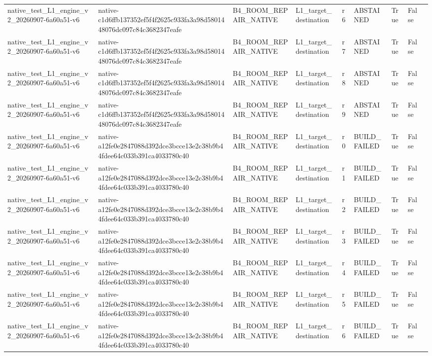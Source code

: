 \begin{tabular}{lllllllll}
native\_test\_L1\_engine\_v2\_20260907-6a60a51-v6 & native-c1d6ffb137352ef5f4f2625c933fa3a98d5801448076dc097c84c3682347eafe & B4\_ROOM\_REPAIR\_NATIVE & L1\_target\_destination & r6 & ABSTAINED & True & False &  \\
native\_test\_L1\_engine\_v2\_20260907-6a60a51-v6 & native-c1d6ffb137352ef5f4f2625c933fa3a98d5801448076dc097c84c3682347eafe & B4\_ROOM\_REPAIR\_NATIVE & L1\_target\_destination & r7 & ABSTAINED & True & False &  \\
native\_test\_L1\_engine\_v2\_20260907-6a60a51-v6 & native-c1d6ffb137352ef5f4f2625c933fa3a98d5801448076dc097c84c3682347eafe & B4\_ROOM\_REPAIR\_NATIVE & L1\_target\_destination & r8 & ABSTAINED & True & False &  \\
native\_test\_L1\_engine\_v2\_20260907-6a60a51-v6 & native-c1d6ffb137352ef5f4f2625c933fa3a98d5801448076dc097c84c3682347eafe & B4\_ROOM\_REPAIR\_NATIVE & L1\_target\_destination & r9 & ABSTAINED & True & False &  \\
native\_test\_L1\_engine\_v2\_20260907-6a60a51-v6 & native-a12fe0e2847088d392dce3bcce13e2c38b9b44fdee64c033b391ca4033780c40 & B4\_ROOM\_REPAIR\_NATIVE & L1\_target\_destination & r0 & BUILD\_FAILED & True & False &  \\
native\_test\_L1\_engine\_v2\_20260907-6a60a51-v6 & native-a12fe0e2847088d392dce3bcce13e2c38b9b44fdee64c033b391ca4033780c40 & B4\_ROOM\_REPAIR\_NATIVE & L1\_target\_destination & r1 & BUILD\_FAILED & True & False &  \\
native\_test\_L1\_engine\_v2\_20260907-6a60a51-v6 & native-a12fe0e2847088d392dce3bcce13e2c38b9b44fdee64c033b391ca4033780c40 & B4\_ROOM\_REPAIR\_NATIVE & L1\_target\_destination & r2 & BUILD\_FAILED & True & False &  \\
native\_test\_L1\_engine\_v2\_20260907-6a60a51-v6 & native-a12fe0e2847088d392dce3bcce13e2c38b9b44fdee64c033b391ca4033780c40 & B4\_ROOM\_REPAIR\_NATIVE & L1\_target\_destination & r3 & BUILD\_FAILED & True & False &  \\
native\_test\_L1\_engine\_v2\_20260907-6a60a51-v6 & native-a12fe0e2847088d392dce3bcce13e2c38b9b44fdee64c033b391ca4033780c40 & B4\_ROOM\_REPAIR\_NATIVE & L1\_target\_destination & r4 & BUILD\_FAILED & True & False &  \\
native\_test\_L1\_engine\_v2\_20260907-6a60a51-v6 & native-a12fe0e2847088d392dce3bcce13e2c38b9b44fdee64c033b391ca4033780c40 & B4\_ROOM\_REPAIR\_NATIVE & L1\_target\_destination & r5 & BUILD\_FAILED & True & False &  \\
native\_test\_L1\_engine\_v2\_20260907-6a60a51-v6 & native-a12fe0e2847088d392dce3bcce13e2c38b9b44fdee64c033b391ca4033780c40 & B4\_ROOM\_REPAIR\_NATIVE & L1\_target\_destination & r6 & BUILD\_FAILED & True & False &  \\

\end{tabular}
